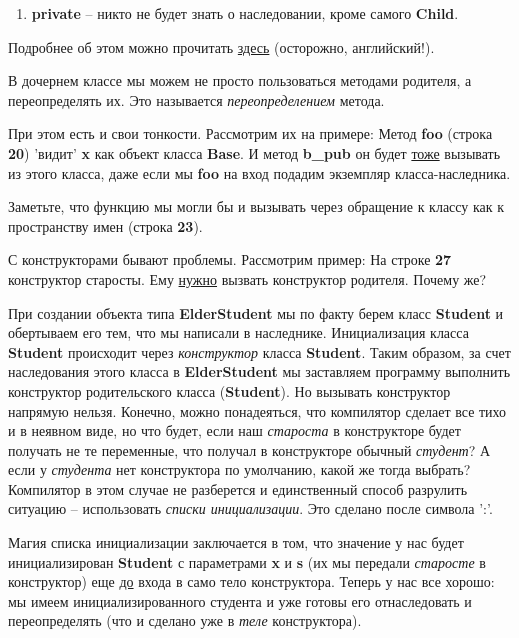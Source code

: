 \begin{lecture}[\lectureSubject]
\begin{lecSection}
\begin{enumerate}
			\item \textbf{private} -- никто не будет знать о наследовании, кроме самого \textbf{Child}.
		\end{enumerate}
		Подробнее об этом можно прочитать \href{https://stackoverflow.com/questions/860339/difference-between-private-public-and-protected-inheritance}{здесь} (осторожно, английский!).
	\end{lecSection}
	\begin{lecSection}
		В дочернем классе мы можем не просто пользоваться методами родителя, а переопределять их. Это называется \textit{переопределением} метода.
		
		При этом есть и свои тонкости. Рассмотрим их на примере:
		Метод \textbf{foo} (строка \textbf{20}) 'видит' \textbf{x} как объект класса \textbf{Base}. И метод \textbf{b\_pub} он будет \underline{тоже} вызывать из этого класса, даже если мы \textbf{foo} на вход подадим экземпляр класса-наследника.
		
		Заметьте, что функцию мы могли бы и вызывать через обращение к классу как к пространству имен (строка \textbf{23}).
	\end{lecSection}
	\begin{lecSection}
			С конструкторами бывают проблемы. Рассмотрим пример:
			На строке \textbf{27} конструктор старосты. Ему \underline{нужно} вызвать конструктор родителя. Почему же?
			
			При создании объекта типа \textbf{ElderStudent} мы по факту берем класс \textbf{Student} и обертываем его тем, что мы написали в наследнике. Инициализация класса \textbf{Student} происходит через \textit{конструктор} класса \textbf{Student}. Таким образом, за счет наследования этого класса в \textbf{ElderStudent} мы заставляем программу выполнить конструктор родительского класса (\textbf{Student}). Но вызывать конструктор напрямую нельзя. Конечно, можно понадеяться, что компилятор сделает все тихо и в неявном виде, но что будет, если наш \textit{староста} в конструкторе будет получать не те переменные, что получал в конструкторе обычный \textit{студент}? А если у \textit{студента} нет конструктора по умолчанию, какой же тогда выбрать? Компилятор в этом случае не разберется и единственный способ разрулить ситуацию -- использовать \textit{списки 
				инициализации}. Это сделано после символа ':'.
			
			Магия списка инициализации заключается в том, что значение у нас будет инициализирован \textbf{Student} с параметрами \textbf{x} и \textbf{s} (их мы передали \textit{старосте} в конструктор) еще \underline{до} входа в само тело конструктора. Теперь у нас все хорошо: мы имеем инициализированного студента и уже готовы его отнаследовать и переопределять (что и сделано уже в \textit{теле} конструктора).
			

\end{lecSection}
\end{lecture}
